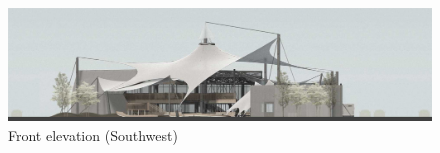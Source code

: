 ﻿%
\begin{figure}[H]
	\centering
	\includegraphics[width=\linewidth]{src/graphics/hawker-center-jakarta-experimental--perspective-front-elevation-southwest.jpg}
	\caption*{%
		Front elevation (Southwest)
	}
	\label{
		fig:hawker-center-jakarta-experimental--perspective-front-elevation-southwest
	}
\end{figure}
